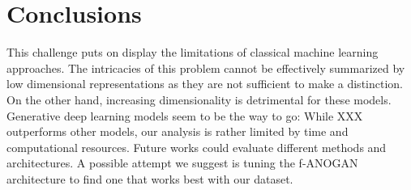 \documentclass{article}
\begin{document}
\section{Conclusions}
This challenge puts on display the limitations of classical machine learning approaches. The intricacies of this problem cannot be effectively summarized by low dimensional representations as they are not sufficient to make a distinction. On the other hand, increasing dimensionality is detrimental for these models. Generative deep learning models seem to be the way to go: 
While XXX outperforms other models, our analysis is rather limited by time and computational resources. Future works could evaluate different methods and architectures. A possible attempt we suggest is tuning the f-ANOGAN architecture to find one that works best with our dataset.

\printbibliography
\end{document}

